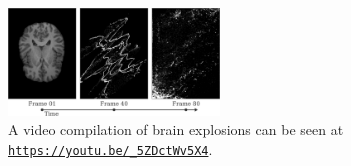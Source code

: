 \documentclass[../main.tex]{subfiles}
\begin{document}
\begin{figure}
	\centering
	\includegraphics[width=0.5\textwidth]{images/exploding_brains.png}
	\caption{A video compilation of brain explosions can be seen at \texttt{\url{https://youtu.be/_5ZDctWv5X4}}.}
	\label{fig:exploding_brains}
\end{figure}

\printbibliography
\end{document}
